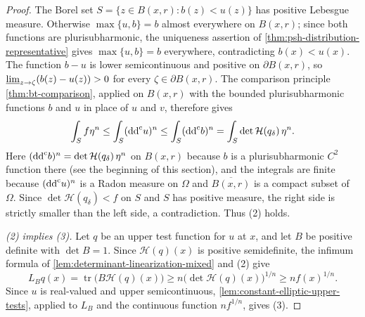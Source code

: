 \begin{proof}
The Borel set $S=\{z\in B(x,r):b(z)<u(z)\}$ has positive Lebesgue measure. Otherwise $\max\{u,b\}=b$ almost everywhere on $B(x,r)$; since both functions are plurisubharmonic, the uniqueness assertion of \cref{thm:psh-distribution-representative} gives $\max\{u,b\}=b$ everywhere, contradicting $b(x)<u(x)$. The function $b-u$ is lower semicontinuous and positive on $\partial B(x,r)$, so $\varliminf_{z\to\zeta}(b(z)-u(z))>0$ for every $\zeta\in\partial B(x,r)$. The comparison principle \cref{thm:bt-comparison}, applied on $B(x,r)$ with the bounded plurisubharmonic functions $b$ and $u$ in place of $u$ and $v$, therefore gives
\[
 \int_S f\eta^n\le\int_S(\mathrm{dd}^{\mathrm{c}} u)^n\le\int_S(\mathrm{dd}^{\mathrm{c}} b)^n=\int_S\det\mathcal H(q_\delta)\,\eta^n.
\]
Here $(\mathrm{dd}^{\mathrm{c}} b)^n=\det\mathcal H(q_\delta)\,\eta^n$ on $B(x,r)$ because $b$ is a plurisubharmonic $C^2$ function there (see the beginning of this section), and the integrals are finite because $(\mathrm{dd}^{\mathrm{c}} u)^n$ is a Radon measure on $\Omega$ and $\overline{B(x,r)}$ is a compact subset of $\Omega$. Since $\det\mathcal H(q_\delta)<f$ on $S$ and $S$ has positive measure, the right side is strictly smaller than the left side, a contradiction. Thus (2) holds.

\emph{(2) implies (3).} Let $q$ be an upper test function for $u$ at $x$, and let $B$ be positive definite with $\det B=1$. Since $\mathcal H(q)(x)$ is positive semidefinite, the infimum formula of \cref{lem:determinant-linearization-mixed} and (2) give
\[
 L_Bq(x)=\operatorname{tr}\bigl(B\mathcal H(q)(x)\bigr)\ge n\bigl(\det\mathcal H(q)(x)\bigr)^{1/n}\ge nf(x)^{1/n}.
\]
Since $u$ is real-valued and upper semicontinuous, \cref{lem:constant-elliptic-upper-tests}, applied to $L_B$ and the continuous function $nf^{1/n}$, gives (3).


\end{proof}
